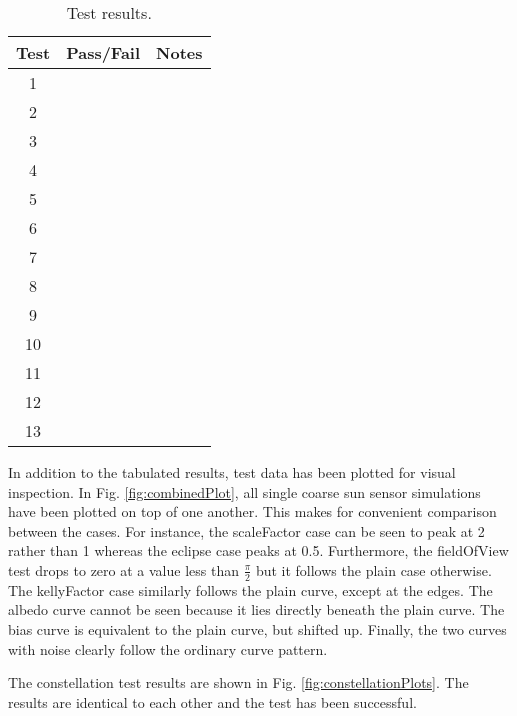 \begin{table}[H]
	\caption{Test results.}
	\label{tab:results}
	\centering \fontsize{10}{10}\selectfont
	\begin{tabular}{ c | c | c } %
		\hline
		\textbf{Test} & \textbf{Pass/Fail} 						   		    			& \textbf{Notes} 									      \\ \hline
		1	   			  	&      	   			& 	         	\\ \hline
		2	   			  	&       			& 	       \\ \hline
		3	   			  	&			& 	 \\ \hline
		4	   			  	& 			& 	   \\ \hline
		5	   			  	&			& 	 \\ \hline
		6	   			  	&      	  			& 	              \\ \hline
		7	   			  	&    		& 	     	 \\ \hline
		8	   			  	&      			& 	           		\\ \hline
		9	   			  	& 			& 	        \\ \hline
		10	   			  	&      & 	   \\ \hline
		11	   			  	&    & \\ \hline
		12	   			  	&  		& 	      	\\ \hline
		13	   			  	& 	&		\\ \hline
	
	\end{tabular}
\end{table}

In addition to the tabulated results, test data has been plotted for visual inspection. In Fig. \ref{fig:combinedPlot}, all single coarse sun sensor simulations have been plotted on top of one another. This makes for convenient comparison between the cases. For instance, the scaleFactor case can be seen to peak at 2 rather than 1 whereas the eclipse case peaks at 0.5. Furthermore, the fieldOfView test drops to zero at a value less than $\frac{\pi}{2}$ but it follows the plain case otherwise. The kellyFactor case similarly follows the plain curve, except at the edges. The albedo curve cannot be seen because it lies directly beneath the plain curve. The bias curve is equivalent to the plain curve, but shifted up. Finally, the two curves with noise clearly follow the ordinary curve pattern.


\clearpage
The constellation test results are shown in Fig. \ref{fig:constellationPlots}. The results are identical to each other and the test has been successful.



